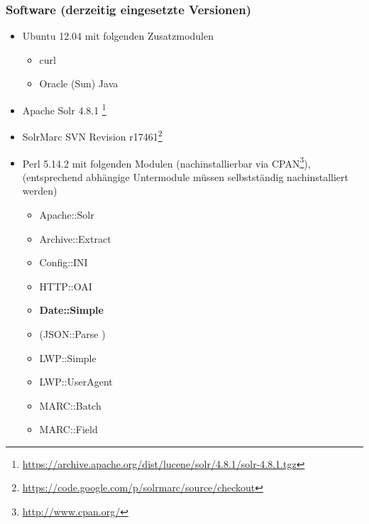\documentclass[10pt]{article}
\begin{document}
\subsubsection{Software (derzeitig eingesetzte Versionen)}
\label{sec:subsub:software}
\begin{itemize}
	\item Ubuntu 12.04 mit folgenden Zusatzmodulen
	\begin{itemize}
		\item curl
		\item Oracle (Sun) Java
	\end{itemize}
	\item Apache Solr 4.8.1 \footnote{\url{https://archive.apache.org/dist/lucene/solr/4.8.1/solr-4.8.1.tgz}}
	\item SolrMarc SVN Revision r17461\footnote{\url{https://code.google.com/p/solrmarc/source/checkout}}
	\item Perl 5.14.2 mit folgenden Modulen (nachinstallierbar via CPAN\footnote{\url{http://www.cpan.org/}}), (entsprechend abhängige Untermodule müssen selbstständig nachinstalliert werden)
	\begin{itemize}
		\item Apache::Solr %
		\item Archive::Extract	%
		\item Config::INI		%
		\item HTTP::OAI 		%
		\item \textbf{Date::Simple}
		\item (JSON::Parse )	%
		\item LWP::Simple 		%
		\item LWP::UserAgent 	%
		\item MARC::Batch 		%
		\item MARC::Field 		%

\end{itemize}
\end{itemize}
\end{document}
